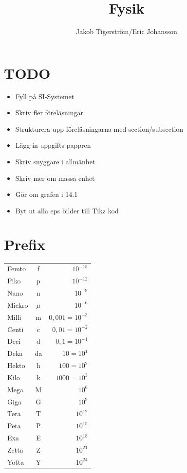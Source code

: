 \documentclass[a4paper,11pt]{article}
\title{Fysik}
\author{Jakob Tigerström/Eric Johansson}
\begin{document}
\maketitle
\tableofcontents
\newpage
\begin{flushleft}
\section{TODO}
\begin{itemize}
  \item Fyll på SI-Systemet
  \item Skriv fler föreläsningar
  \item Strukturera upp föreläsningarna med section/subsection
  \item Lägg in uppgifts pappren
  \item Skriv snyggare i allmänhet
  \item Skriv mer om massa enhet
  \item Gör om grafen i 14.1
  \item Byt ut alla eps bilder till Tikz kod
\end{itemize}
\section{Prefix}

\begin{tabular}{l c r}
  Femto & f & $ 10^{-15} $\\ 
  Piko & p & $ 10^{-12} $\\ 
  Nano & n & $ 10^{-9} $\\ 
  Mickro & $ \mu $ & $ 10^{-6} $\\ 
  Milli & m & $ 0,001 = 10^{-3} $\\
  Centi & c & $ 0,01 = 10^{-2} $\\
  Deci & d & $ 0,1 = 10^{-1}$\\
  Deka & da & $ 10 = 10^1 $\\
  Hekto & h & $ 100 = 10^2 $\\
  Kilo & k & $ 1000 = 10^3 $\\
  Mega & M & $ 10^6 $\\
  Giga & G & $ 10^9 $\\
  Tera & T & $ 10^{12} $\\
  Peta & P & $ 10^{15} $\\
  Exa & E & $ 10^{18} $\\
  Zetta & Z & $ 10^{21} $\\
  Yotta & Y & $ 10^{24} $\\
\end{tabular}
\newpage

\end{flushleft}
\end{document}
